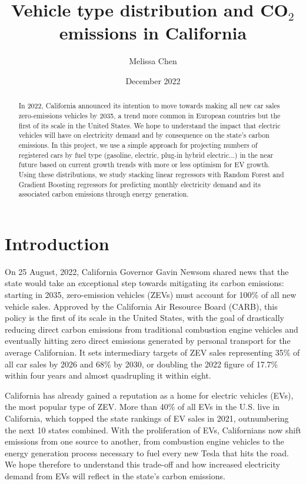 \documentclass{article}
\begin{document}
\title{Vehicle type distribution and CO\(_2\) emissions in California}
\author{Melissa Chen}
\date{December 2022}

\maketitle

\begin{abstract}
In 2022, California announced its intention to move towards making all new car sales zero-emissions vehicles by 2035, a trend more common in European countries but the first of its scale in the United States. We hope to understand the impact that electric vehicles will have on electricity demand and by consequence on the state's carbon emissions. In this project, we use a simple approach for projecting numbers of registered cars by fuel type (gasoline, electric, plug-in hybrid electric...) in the near future based on current growth trends with more or less optimism for EV growth. Using these distributions, we study stacking linear regressors with Random Forest and Gradient Boosting regressors for predicting monthly electricity demand and its associated carbon emissions through energy generation.
\end{abstract}

\section{Introduction}
On 25 August, 2022, California Governor Gavin Newsom shared news that the state would take an exceptional step towards mitigating its carbon emissions: starting in 2035, zero-emission vehicles (ZEVs) must account for 100\% of all new vehicle sales. Approved by the California Air Resource Board (CARB), this policy is the first of its scale in the United States, with the goal of drastically reducing direct carbon emissions from traditional combustion engine vehicles and eventually hitting zero direct emissions generated by personal transport for the average Californian. It sets intermediary targets of ZEV sales representing 35\% of all car sales by 2026 and 68\% by 2030, or doubling the 2022 figure of 17.7\% within four years and almost quadrupling it within eight. \citep{zevpolicy, currentzevsales}

California has already gained a reputation as a home for electric vehicles (EVs), the most popular type of ZEV. More than 40\% of all EVs in the U.S. live in California, which topped the state rankings of EV sales in 2021, outnumbering the next 10 states combined. \citep{nationalzevmarket} With the proliferation of EVs, Californians now shift emissions from one source to another, from combustion engine vehicles to the energy generation process necessary to fuel every new Tesla that hits the road. We hope therefore to understand this trade-off and how increased electricity demand from EVs will reflect in the state's carbon emissions.
\end{document}
